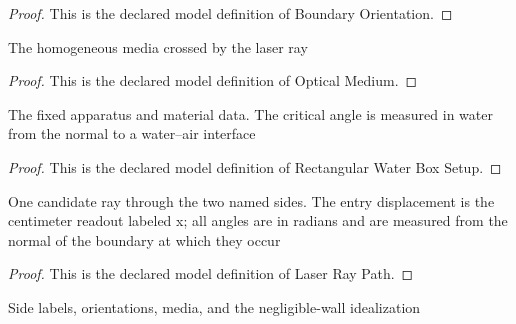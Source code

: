 \begin{proof}
  This is the declared model definition of Boundary Orientation.
\end{proof}
\begin{definition}
  \label{def:physics:phyx-mini-0072:phyxminiproblems-problemphyxmini0072-opticalmedium}
  The homogeneous media crossed by the laser ray
\end{definition}
\begin{proof}
  This is the declared model definition of Optical Medium.
\end{proof}
\begin{definition}
  \label{def:physics:phyx-mini-0072:phyxminiproblems-problemphyxmini0072-rectangularwaterboxsetup}
  The fixed apparatus and material data. The critical angle is measured in water from the normal to a water--air interface
\end{definition}
\begin{proof}
  This is the declared model definition of Rectangular Water Box Setup.
\end{proof}
\begin{definition}
  \label{def:physics:phyx-mini-0072:phyxminiproblems-problemphyxmini0072-laserraypath}
  One candidate ray through the two named sides. The entry displacement is the centimeter readout labeled x; all angles are in radians and are measured from the normal of the boundary at which they occur
\end{definition}
\begin{proof}
  This is the declared model definition of Laser Ray Path.
\end{proof}
\begin{definition}
  \label{def:physics:phyx-mini-0072:phyxminiproblems-problemphyxmini0072-hasdepictedrectangularlayout}
  Side labels, orientations, media, and the negligible-wall idealization
\end{definition}
